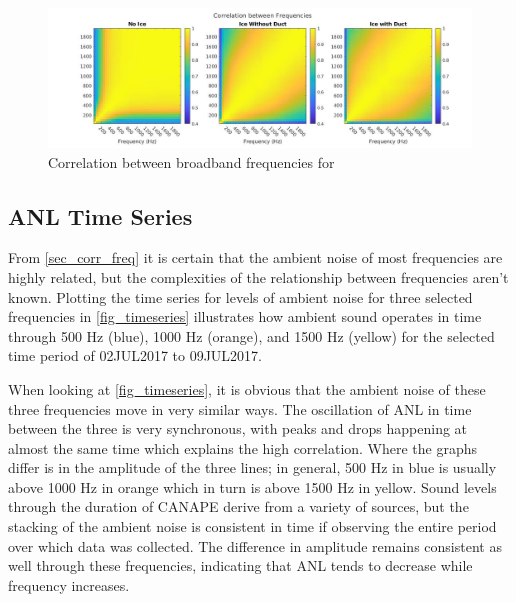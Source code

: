 
\begin{figure}[ht]
\centering
\includegraphics[scale=0.35]{Figures/corr_all_1x3.jpg}
\caption{Correlation between broadband frequencies for }
\label{fig_freq_corr}
\end{figure}

\subsection{ANL Time Series}\label{sec_timeseries}

From \autoref{sec_corr_freq} it is certain that the ambient noise of most frequencies are highly related, but the complexities of the relationship between frequencies aren't known. Plotting the time series for levels of ambient noise for three selected frequencies in \autoref{fig_timeseries} illustrates how ambient sound operates in time through 500 Hz (blue), 1000 Hz (orange), and 1500 Hz (yellow) for the selected time period of 02JUL2017 to 09JUL2017. %

When looking at \autoref{fig_timeseries}, it is obvious that the ambient noise of these three frequencies move in very similar ways. The oscillation of ANL in time between the three is very synchronous, with peaks and drops happening at almost the same time which explains the high correlation. Where the graphs differ is in the amplitude of the three lines; in general, 500 Hz in blue is usually above 1000 Hz in orange which in turn is above 1500 Hz in yellow. Sound levels through the duration of CANAPE derive from a variety of sources, but the stacking of the ambient noise is consistent in time if observing the entire period over which data was collected. The difference in amplitude remains consistent as well through these frequencies, indicating that ANL tends to decrease while frequency increases. 

